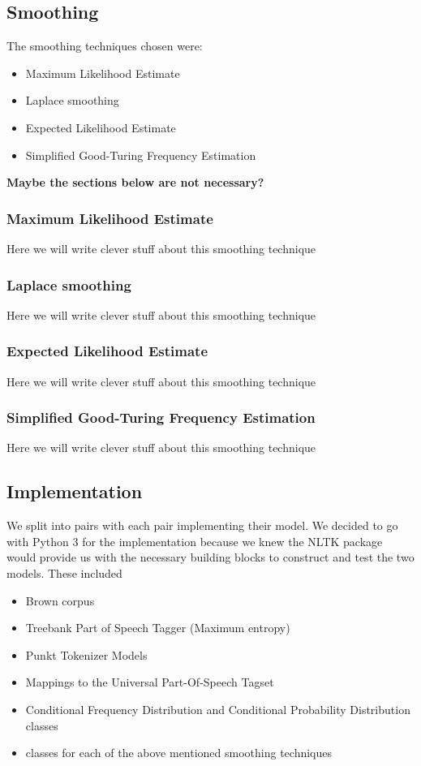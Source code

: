 \documentclass[a4paper,12pt]{article}
\begin{document}
\subsection{Smoothing}
The smoothing techniques chosen were:
\begin{itemize}
\item Maximum Likelihood Estimate
\item Laplace smoothing
\item Expected Likelihood Estimate
\item Simplified Good-Turing Frequency Estimation
\end{itemize}

\textbf{Maybe the sections below are not necessary?}

\subsubsection{Maximum Likelihood Estimate}
Here we will write clever stuff about this smoothing technique

\subsubsection{Laplace smoothing}
Here we will write clever stuff about this smoothing technique

\subsubsection{Expected Likelihood Estimate}
Here we will write clever stuff about this smoothing technique

\subsubsection{Simplified Good-Turing Frequency Estimation}
Here we will write clever stuff about this smoothing technique


\subsection{Implementation}
\label{sec:impl}

We split into pairs with each pair implementing their model. We decided to go with Python 3 for the implementation because we knew the NLTK package would provide us with the necessary building blocks to construct and test the two models. These included 
\begin{itemize}
\item Brown corpus
\item Treebank Part of Speech Tagger (Maximum entropy)
\item Punkt Tokenizer Models
\item Mappings to the Universal Part-Of-Speech Tagset
\item Conditional Frequency Distribution and Conditional Probability Distribution classes
\item classes for each of the above mentioned smoothing techniques
\end{itemize}
\end{document}
